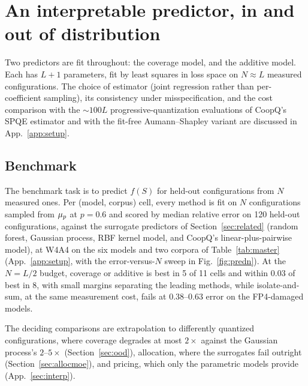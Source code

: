 \section{An interpretable predictor, in and out of distribution}\label{sec:predictor}

Two predictors are fit throughout: the coverage model, and the additive model. Each has $L+1$ parameters, 
fit by least squares in
loss space on $N \approx L$ measured configurations.
The choice of estimator (joint regression rather than per-coefficient sampling), its consistency under
misspecification, and the cost comparison with the ${\sim}100L$ progressive-quantization
evaluations of CoopQ's SPQE estimator and with the fit-free Aumann--Shapley variant are discussed in
App.~\ref{app:setup}.

\subsection{Benchmark}\label{sec:benchmark}

The benchmark task is to predict $f(S)$ for held-out configurations from $N$ measured ones. Per
(model, corpus) cell, every method is fit on $N$ configurations sampled from $\mu_p$ at $p=0.6$ and
scored by median relative error on 120 held-out configurations, against the surrogate predictors of
Section~\ref{sec:related} (random forest, Gaussian process, RBF kernel model, and CoopQ's
linear-plus-pairwise model), at W4A4 on the six models and two corpora of Table~\ref{tab:master}
(App.~\ref{app:setup}, with the error-versus-$N$ sweep in Fig.~\ref{fig:predn}). At the $N=L/2$ budget,
coverage
or additive is best in 5 of 11 cells and within 0.03 of best in 8, with small margins separating the
leading methods, while isolate-and-sum, at the same measurement cost, fails at 0.38--0.63 error on the
FP4-damaged models. 


The deciding comparisons are extrapolation to differently quantized configurations,
where coverage degrades at most $2\times$ against the Gaussian process's $2$--$5\times$
(Section~\ref{sec:ood}), allocation, where the surrogates fail outright (Section~\ref{sec:allocmoe}),
and pricing, which only the parametric models provide (App.~\ref{sec:interp}).

